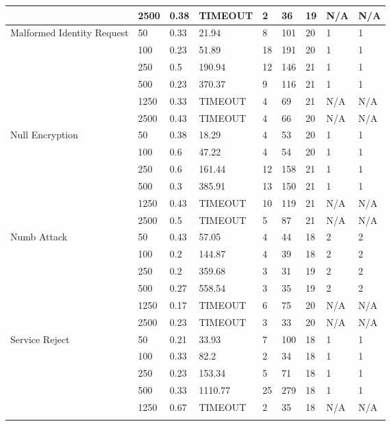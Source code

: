 \begin{table*}[]
{\begin{minipage}{2\columnwidth}
\begin{tabular}{|l|l|l|l|l|l|l|l|l|}
   & 2500 & 0.38 & TIMEOUT & 2 & 36 & 19 & N/A & N/A \\ \hline
  \multirow{6}{*}{Malformed Identity Request} & 50 & 0.33 & 21.94 & 8 & 101 & 20 & 1 & 1 \\ \cline{2-9}
   & 100 & 0.23 & 51.89 & 18 & 191 & 20 & 1 & 1 \\ \cline{2-9}
   & 250 & 0.5 & 190.94 & 12 & 146 & 21 & 1 & 1 \\ \cline{2-9}
   & 500 & 0.23 & 370.37 & 9 & 116 & 21 & 1 & 1 \\ \cline{2-9}
   & 1250 & 0.33 & TIMEOUT & 4 & 69 & 21 & N/A & N/A \\ \cline{2-9}
   & 2500 & 0.43 & TIMEOUT & 4 & 66 & 20 & N/A & N/A \\ \hline
  \multirow{6}{*}{Null Encryption} & 50 & 0.38 & 18.29 & 4 & 53 & 20 & 1 & 1 \\ \cline{2-9}
   & 100 & 0.6 & 47.22 & 4 & 54 & 20 & 1 & 1 \\ \cline{2-9}
   & 250 & 0.6 & 161.44 & 12 & 158 & 21 & 1 & 1 \\ \cline{2-9}
   & 500 & 0.3 & 385.91 & 13 & 150 & 21 & 1 & 1 \\ \cline{2-9}
   & 1250 & 0.43 & TIMEOUT & 10 & 119 & 21 & N/A & N/A \\ \cline{2-9}
   & 2500 & 0.5 & TIMEOUT & 5 & 87 & 21 & N/A & N/A \\ \hline
  \multirow{6}{*}{Numb Attack} & 50 & 0.43 & 57.05 & 4 & 44 & 18 & 2 & 2 \\ \cline{2-9}
   & 100 & 0.2 & 144.87 & 4 & 39 & 18 & 2 & 2 \\ \cline{2-9}
   & 250 & 0.2 & 359.68 & 3 & 31 & 19 & 2 & 2 \\ \cline{2-9}
   & 500 & 0.27 & 558.54 & 3 & 35 & 19 & 2 & 2 \\ \cline{2-9}
   & 1250 & 0.17 & TIMEOUT & 6 & 75 & 20 & N/A & N/A \\ \cline{2-9}
   & 2500 & 0.23 & TIMEOUT & 3 & 33 & 20 & N/A & N/A \\ \hline
  \multirow{6}{*}{Service Reject} & 50 & 0.21 & 33.93 & 7 & 100 & 18 & 1 & 1 \\ \cline{2-9}
   & 100 & 0.33 & 82.2 & 2 & 34 & 18 & 1 & 1 \\ \cline{2-9}
   & 250 & 0.23 & 153.34 & 5 & 71 & 18 & 1 & 1 \\ \cline{2-9}
   & 500 & 0.33 & 1110.77 & 25 & 279 & 18 & 1 & 1 \\ \cline{2-9}
   & 1250 & 0.67 & TIMEOUT & 2 & 35 & 18 & N/A & N/A \\ \cline{2-9}

\end{tabular}
\end{minipage}}
\end{table*}

